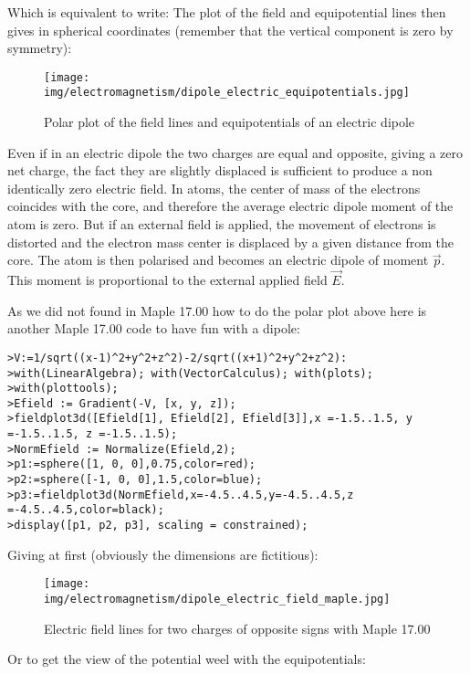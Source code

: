 	Which is equivalent to write:
	The plot of the field and equipotential lines  then gives in spherical coordinates (remember that the vertical component is zero by symmetry):
	\begin{figure}[H]
		\centering
		\texttt{[image: img/electromagnetism/dipole\_electric\_equipotentials.jpg]}
		\caption{Polar plot of the field lines and equipotentials of an electric dipole}
	\end{figure}
	Even if in an electric dipole the two charges are equal and opposite, giving a zero net charge, the fact they are slightly displaced is sufficient to produce a non identically zero electric field. In atoms, the center of mass of the electrons coincides with the core, and therefore the average electric dipole moment of the atom is zero. But if an external field is applied, the movement of electrons is distorted and the electron mass center is displaced by a given distance from the core. The atom is then polarised and becomes an electric dipole of moment $\vec{p}$. This moment is proportional to the external applied field $\vec{E}$.

	As we did not found in Maple 17.00 how to do the polar plot above here is another Maple 17.00  code to have fun with a dipole:
	
	\texttt{>V:=1/sqrt((x-1)\string^2+y\string^2+z\string^2)-2/sqrt((x+1)\string^2+y\string^2+z\string^2):\\
	>with(LinearAlgebra); with(VectorCalculus); with(plots);\\
	>with(plottools);\\
	>Efield := Gradient(-V, [x, y, z]);\\
	>fieldplot3d([Efield[1], Efield[2], Efield[3]],x =-1.5..1.5, y =-1.5..1.5, z =-1.5..1.5);\\
	>NormEfield := Normalize(Efield,2);\\
	>p1:=sphere([1, 0, 0],0.75,color=red);\\
	>p2:=sphere([-1, 0, 0],1.5,color=blue);\\
	>p3:=fieldplot3d(NormEfield,x=-4.5..4.5,y=-4.5..4.5,z =-4.5..4.5,color=black);\\
	>display([p1, p2, p3], scaling = constrained);
	}

	Giving at first (obviously the dimensions are fictitious):
	\begin{figure}[H]
		\centering
		\texttt{[image: img/electromagnetism/dipole\_electric\_field\_maple.jpg]}
		\caption{Electric field lines for two charges of opposite signs with Maple 17.00}
	\end{figure}
	Or to get the view of the potential weel with the equipotentials:


